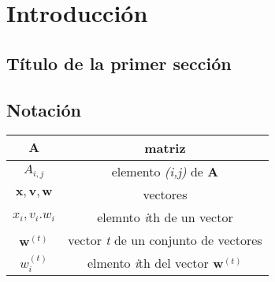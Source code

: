 \chapter{Introducción}

\section{Título de la primer sección}
\section{Notación}
\begin{tabular}{|c|c|}
\hline
$\mathbf{A}$ & matriz \\
\hline
$A_{i,j}$ & elemento \textit{(i,j)} de \textbf{A} \\
\hline
$\mathbf{x},\mathbf{v},\mathbf{w}$ & vectores \\
\hline
$x_i, v_i. w_i$ & elemnto \textit{i}th de un vector \\
\hline
$\mathbf{w}^{(t)}$ & vector \textit{t} de un conjunto de vectores \\
\hline
$w_i^{(t)}$ & elmento \textit{i}th del vector $\mathbf{w}^{(t)}$ \\
\hline
\end{tabular}
